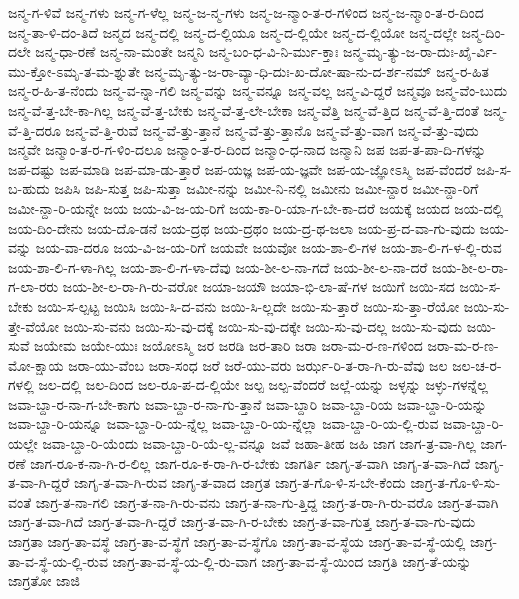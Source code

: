 {ಜನ್ಮ-ಗ-ಳಿವೆ
ಜನ್ಮ-ಗಳು
ಜನ್ಮ-ಗ-ಳೆಲ್ಲ
ಜನ್ಮ-ಜ-ನ್ಮ-ಗಳು
ಜನ್ಮ-ಜ-ನ್ಮಾಂ-ತ-ರ-ಗಳಿಂದ
ಜನ್ಮ-ಜ-ನ್ಮಾಂ-ತ-ರ-ದಿಂದ
ಜನ್ಮ-ತಾ-ಳಿ-ದಂ-ತಿದೆ
ಜನ್ಮದ
ಜನ್ಮ-ದಲ್ಲಿ
ಜನ್ಮ-ದ-ಲ್ಲಿಯೂ
ಜನ್ಮ-ದ-ಲ್ಲಿಯೇ
ಜನ್ಮ-ದ-ಲ್ಲಿಯೋ
ಜನ್ಮ-ದಲ್ಲೇ
ಜನ್ಮ-ದಿಂ-ದಲೇ
ಜನ್ಮ-ಧಾ-ರಣೆ
ಜನ್ಮ-ನಾ-ಮಂತೇ
ಜನ್ಮನಿ
ಜನ್ಮ-ಬಂ-ಧ-ವಿ-ನಿ-ರ್ಮು-ಕ್ತಾಃ
ಜನ್ಮ-ಮೃ-ತ್ಯು-ಜ-ರಾ-ದುಃ-ಖೈ-ರ್ವಿ-ಮು-ಕ್ತೋ-ಽಮೃ-ತ-ಮ-ಶ್ನುತೇ
ಜನ್ಮ-ಮೃ-ತ್ಯು-ಜ-ರಾ-ವ್ಯಾ-ಧಿ-ದುಃ-ಖ-ದೋ-ಷಾ-ನು-ದ-ರ್ಶ-ನಮ್
ಜನ್ಮ-ರ-ಹಿತ
ಜನ್ಮ-ರ-ಹಿ-ತ-ನೆಂದು
ಜನ್ಮ-ವ-ನ್ನಾ-ಗಲಿ
ಜನ್ಮ-ವನ್ನು
ಜನ್ಮ-ವನ್ನೂ
ಜನ್ಮ-ವಲ್ಲ
ಜನ್ಮ-ವಿ-ದ್ದರೆ
ಜನ್ಮವೂ
ಜನ್ಮ-ವೆಂ-ಬುದು
ಜನ್ಮ-ವೆ-ತ್ತ-ಬೇ-ಕಾ-ಗಿಲ್ಲ
ಜನ್ಮ-ವೆ-ತ್ತ-ಬೇಕು
ಜನ್ಮ-ವೆ-ತ್ತ-ಲೇ-ಬೇಕಾ
ಜನ್ಮ-ವೆತ್ತಿ
ಜನ್ಮ-ವೆ-ತ್ತಿದ
ಜನ್ಮ-ವೆ-ತ್ತಿ-ದಂತೆ
ಜನ್ಮ-ವೆ-ತ್ತಿ-ದರೂ
ಜನ್ಮ-ವೆ-ತ್ತಿ-ರುವೆ
ಜನ್ಮ-ವೆ-ತ್ತು-ತ್ತಾನೆ
ಜನ್ಮ-ವೆ-ತ್ತು-ತ್ತಾನೊ
ಜನ್ಮ-ವೆ-ತ್ತು-ವಾಗ
ಜನ್ಮ-ವೆ-ತ್ತು-ವುದು
ಜನ್ಮವೇ
ಜನ್ಮಾಂ-ತ-ರ-ಗ-ಳಿಂ-ದಲೂ
ಜನ್ಮಾಂ-ತ-ರ-ದಿಂದ
ಜನ್ಮಾಂ-ಧ-ನಾದ
ಜನ್ಮಾನಿ
ಜಪ
ಜಪ-ತ-ಪಾ-ದಿ-ಗಳನ್ನು
ಜಪ-ದಷ್ಟು
ಜಪ-ಮಾಡಿ
ಜಪ-ಮಾ-ಡು-ತ್ತಾರೆ
ಜಪ-ಯಜ್ಞ
ಜಪ-ಯ-ಜ್ಞವೇ
ಜಪ-ಯ-ಜ್ಞೋಽಸ್ಮಿ
ಜಪ-ವೆಂದರೆ
ಜಪಿ-ಸ-ಬ-ಹುದು
ಜಪಿಸಿ
ಜಪಿ-ಸುತ್ತ
ಜಪಿ-ಸುತ್ತಾ
ಜಮೀ-ನನ್ನು
ಜಮೀ-ನಿ-ನಲ್ಲಿ
ಜಮೀನು
ಜಮೀ-ನ್ದಾರ
ಜಮೀ-ನ್ದಾ-ರಿಗೆ
ಜಮೀ-ನ್ದಾ-ರಿ-ಯನ್ನೇ
ಜಯ
ಜಯ-ವಿ-ಜ-ಯ-ರಿಗೆ
ಜಯ-ಕಾ-ರಿ-ಯಾ-ಗ-ಬೇ-ಕಾ-ದರೆ
ಜಯಕ್ಕೆ
ಜಯದ
ಜಯ-ದಲ್ಲಿ
ಜಯ-ದಿಂ-ದೇನು
ಜಯ-ದೊ-ಡನೆ
ಜಯ-ದ್ರಥ
ಜಯ-ದ್ರಥಂ
ಜಯ-ದ್ರ-ಥ-ಜಲಾ
ಜಯ-ಪ್ರ-ದ-ವಾ-ಗು-ವುದು
ಜಯ-ವನ್ನು
ಜಯ-ವಾ-ದರೂ
ಜಯ-ವಿ-ಜ-ಯ-ರಿಗೆ
ಜಯವೇ
ಜಯವೋ
ಜಯ-ಶಾ-ಲಿ-ಗಳ
ಜಯ-ಶಾ-ಲಿ-ಗ-ಳ-ಲ್ಲಿ-ರುವ
ಜಯ-ಶಾ-ಲಿ-ಗ-ಳಾ-ಗಿಲ್ಲ
ಜಯ-ಶಾ-ಲಿ-ಗ-ಳಾ-ದೆವು
ಜಯ-ಶೀ-ಲ-ನಾ-ಗದೆ
ಜಯ-ಶೀ-ಲ-ನಾ-ದರೆ
ಜಯ-ಶೀ-ಲ-ರಾ-ಗ-ಲಾ-ರರು
ಜಯ-ಶೀ-ಲ-ರಾ-ಗಿ-ರು-ವರೋ
ಜಯಾ-ಜಯೌ
ಜಯಾ-ಭಿ-ಲಾ-ಷೆ-ಗಳ
ಜಯಿಗೆ
ಜಯಿ-ಸದ
ಜಯಿ-ಸ-ಬೇಕು
ಜಯಿ-ಸ-ಲ್ಪಟ್ಟ
ಜಯಿಸಿ
ಜಯಿ-ಸಿ-ದ-ವನು
ಜಯಿ-ಸಿ-ಲ್ಲದೇ
ಜಯಿ-ಸು-ತ್ತಾರೆ
ಜಯಿ-ಸು-ತ್ತಾ-ರೆಯೋ
ಜಯಿ-ಸು-ತ್ತೇ-ವೆಯೋ
ಜಯಿ-ಸು-ವನು
ಜಯಿ-ಸು-ವು-ದಕ್ಕೆ
ಜಯಿ-ಸು-ವು-ದಕ್ಕೇ
ಜಯಿ-ಸು-ವು-ದಲ್ಲ
ಜಯಿ-ಸು-ವುದು
ಜಯಿ-ಸುವೆ
ಜಯೇಮ
ಜಯೇ-ಯುಃ
ಜಯೋಽಸ್ಮಿ
ಜರ
ಜರಡಿ
ಜರ-ತಾರಿ
ಜರಾ
ಜರಾ-ಮ-ರ-ಣ-ಗಳಿಂದ
ಜರಾ-ಮ-ರ-ಣ-ಮೋ-ಕ್ಷಾಯ
ಜರಾ-ಯು-ವೆಂಬ
ಜರಾ-ಸಂಧ
ಜರೆ
ಜರೆ-ಯು-ವರು
ಜರ್ಝ-ರಿ-ತ-ರಾ-ಗಿ-ರು-ವೆವು
ಜಲ
ಜಲ-ಚ-ರ-ಗಳಲ್ಲಿ
ಜಲ-ದಲ್ಲಿ
ಜಲ-ದಿಂದ
ಜಲ-ರೂ-ಪ-ದ-ಲ್ಲಿಯೇ
ಜಲ್ಪ
ಜಲ್ಪ-ವೆಂದರೆ
ಜಲ್ಲೆ-ಯನ್ನು
ಜಳ್ಳನ್ನು
ಜಳ್ಳು-ಗಳನ್ನೆಲ್ಲ
ಜವಾ-ಬ್ದಾ-ರ-ನಾ-ಗ-ಬೇ-ಕಾಗು
ಜವಾ-ಬ್ದಾ-ರ-ನಾ-ಗು-ತ್ತಾನೆ
ಜವಾ-ಬ್ದಾರಿ
ಜವಾ-ಬ್ದಾ-ರಿಯ
ಜವಾ-ಬ್ದಾ-ರಿ-ಯನ್ನು
ಜವಾ-ಬ್ದಾ-ರಿ-ಯನ್ನೂ
ಜವಾ-ಬ್ದಾ-ರಿ-ಯ-ನ್ನೆಲ್ಲ
ಜವಾ-ಬ್ದಾ-ರಿ-ಯ-ನ್ನೆಲ್ಲಾ
ಜವಾ-ಬ್ದಾ-ರಿ-ಯ-ಲ್ಲಿ-ರುವ
ಜವಾ-ಬ್ದಾ-ರಿ-ಯಲ್ಲೇ
ಜವಾ-ಬ್ದಾ-ರಿ-ಯೆಂದು
ಜವಾ-ಬ್ದಾ-ರಿ-ಯೆ-ಲ್ಲ-ವನ್ನೂ
ಜವೆ
ಜಹಾ-ತೀಹ
ಜಹಿ
ಜಾಗ
ಜಾಗ-ತ್ರ-ವಾ-ಗಿಲ್ಲ
ಜಾಗ-ರಣೆ
ಜಾಗ-ರೂ-ಕ-ನಾ-ಗಿ-ರ-ಲಿಲ್ಲ
ಜಾಗ-ರೂ-ಕ-ರಾ-ಗಿ-ರ-ಬೇಕು
ಜಾಗರ್ತಿ
ಜಾಗೃ-ತ-ವಾಗಿ
ಜಾಗೃ-ತ-ವಾ-ಗಿದೆ
ಜಾಗೃ-ತ-ವಾ-ಗಿ-ದ್ದರೆ
ಜಾಗೃ-ತ-ವಾ-ಗಿ-ರುವ
ಜಾಗೃ-ತ-ವಾದ
ಜಾಗ್ರತ
ಜಾಗ್ರ-ತ-ಗೊ-ಳಿ-ಸ-ಬೇ-ಕೆಂದು
ಜಾಗ್ರ-ತ-ಗೊ-ಳಿ-ಸು-ವಂತೆ
ಜಾಗ್ರ-ತ-ನಾ-ಗಲಿ
ಜಾಗ್ರ-ತ-ನಾ-ಗಿ-ರು-ವನು
ಜಾಗ್ರ-ತ-ನಾ-ಗು-ತ್ತಿದ್ದ
ಜಾಗ್ರ-ತ-ರಾ-ಗಿ-ರು-ವರೊ
ಜಾಗ್ರ-ತ-ವಾಗಿ
ಜಾಗ್ರ-ತ-ವಾ-ಗಿದೆ
ಜಾಗ್ರ-ತ-ವಾ-ಗಿ-ದ್ದರೆ
ಜಾಗ್ರ-ತ-ವಾ-ಗಿ-ರ-ಬೇಕು
ಜಾಗ್ರ-ತ-ವಾ-ಗುತ್ತ
ಜಾಗ್ರ-ತ-ವಾ-ಗು-ವುದು
ಜಾಗ್ರತಾ
ಜಾಗ್ರ-ತಾ-ವಸ್ಥೆ
ಜಾಗ್ರ-ತಾ-ವ-ಸ್ಥೆಗೆ
ಜಾಗ್ರ-ತಾ-ವ-ಸ್ಥೆಗೊ
ಜಾಗ್ರ-ತಾ-ವ-ಸ್ಥೆಯ
ಜಾಗ್ರ-ತಾ-ವ-ಸ್ಥೆ-ಯಲ್ಲಿ
ಜಾಗ್ರ-ತಾ-ವ-ಸ್ಥೆ-ಯ-ಲ್ಲಿ-ರುವ
ಜಾಗ್ರ-ತಾ-ವ-ಸ್ಥೆ-ಯ-ಲ್ಲಿ-ರು-ವಾಗ
ಜಾಗ್ರ-ತಾ-ವ-ಸ್ಥೆ-ಯಿಂದ
ಜಾಗ್ರತಿ
ಜಾಗ್ರ-ತೆ-ಯನ್ನು
ಜಾಗ್ರತೋ
ಜಾಜಿ
}
